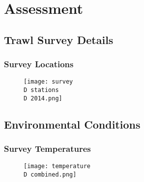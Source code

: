 %
%
%
\section{Assessment}
\subsection{Trawl Survey Details}
%
\begin{frame}
\frametitle{Survey Locations}
\begin{figure}

%
\centerline{\texttt{[image: survey\\D stations\\D 2014.png]}}

%
%
 \end{figure}
\end{frame}


%
%
%
%
\subsection{Environmental Conditions}

\begin{frame}
\frametitle{Survey Temperatures}
\begin{figure}

%
\centerline{\texttt{[image: temperature\\D combined.png]}}
%
%
%
 \end{figure}
\end{frame}
%
%
%
%
%
%
%
%
%
%
%
%
%
%
%
%
%
%
%
%
